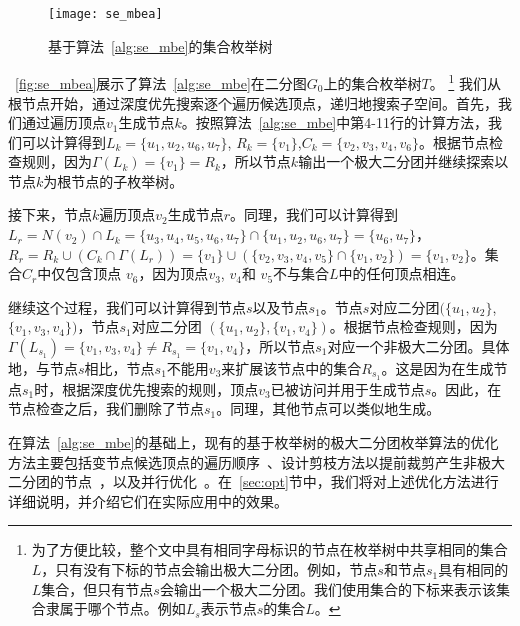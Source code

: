 \begin{figure} [ht]
  \vspace{0.1 in}
  \centering
  \texttt{[image: se\_mbea]}
  \vspace{0.05 in}
  \caption{基于算法~\ref{alg:se_mbe}的集合枚举树}
  \label{fig:se_mbea}
\end{figure}

\begin{example}
  ~\autoref{fig:se_mbea}展示了算法~\ref{alg:se_mbe}在二分图$G_0$上的集合枚举树$T$。
  \footnote{为了方便比较，整个文中具有相同字母标识的节点在枚举树中共享相同的集合$L$，只有没有下标的节点会输出极大二分团。例如，节点$s$和节点$s_1$具有相同的$L$集合，但只有节点$s$会输出一个极大二分团。我们使用集合的下标来表示该集合隶属于哪个节点。例如$L_s$表示节点$s$的集合$L$。 
}
我们从根节点开始，通过深度优先搜索逐个遍历候选顶点，递归地搜索子空间。首先，我们通过遍历顶点$v_1$生成节点$k$。按照算法~\ref{alg:se_mbe}中第4-11行的计算方法，我们可以计算得到$L_k=\{u_1, u_2, u_6, u_7\}$, $R_k=\{v_1\}$,$C_k=\{v_2,v_3,v_4,v_6\}$。根据节点检查规则，因为$\Gamma(L_{k}) = \{v_1\} = R_{k}$，所以节点$k$输出一个极大二分团并继续探索以节点$k$为根节点的子枚举树。

接下来，节点$k$遍历顶点$v_2$生成节点$r$。同理，我们可以计算得到$L_{r} = N(v_2) \cap L_{k} 
= \{u_3, u_4, u_5, u_6, u_7\} \cap \{u_1, u_2, u_6, u_7\} = \{u_6, u_7\}$， $R_{r} = R_{k} \cup (C_{k} \cap \Gamma(L_{r})) = \{v_1\} \cup (\{v_2, v_3, v_4, v_5\} \cap \{v_1, v_2\}) = \{v_1, v_2\}$。集合$C_{r}$中仅包含顶点 $v_6$，因为顶点$v_3$, $v_4$和 $v_5$不与集合$L$中的任何顶点相连。

继续这个过程，我们可以计算得到节点$s$以及节点$s_1$。节点$s$对应二分团$(\{u_1, u_2\}$, $\{v_1, v_3, v_4\})$，节点$s_1$对应二分团 $(\{u_1, u_2\}, \{v_1, v_4\})$。根据节点检查规则，因为$\Gamma(L_{s_1}) = \{v_1, v_3, v_4\} \neq R_{s_1} = \{v_1, v_4\}$，所以节点$s_1$对应一个非极大二分团。具体地，与节点$s$相比，节点$s_1$不能用$v_3$来扩展该节点中的集合$R_{s_1}$。这是因为在生成节点$s_1$时，根据深度优先搜索的规则，顶点$v_3$已被访问并用于生成节点$s$。因此，在节点检查之后，我们删除了节点$s_1$。同理，其他节点可以类似地生成。

\end{example}

在算法~\ref{alg:se_mbe}的基础上，现有的基于枚举树的极大二分团枚举算法的优化方法主要包括变节点候选顶点的遍历顺序~\cite{minel06,iMBEA14,PMBE20,ooMBE22}、设计剪枝方法以提前裁剪产生非极大二分团的节点~\cite{iMBEA14,PMBE20,ooMBE22}，以及并行优化~\cite{mapreduceMBE16,parMBE18}。在~\ref{sec:opt}节中，我们将对上述优化方法进行详细说明，并介绍它们在实际应用中的效果。

